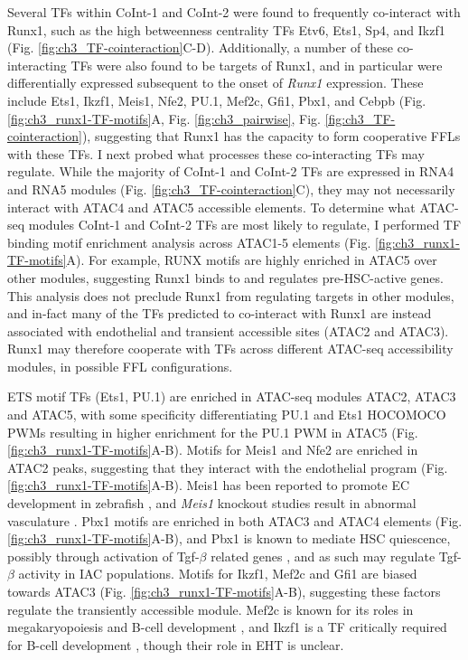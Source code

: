 Several TFs within CoInt-1 and CoInt-2 were found to frequently co-interact with Runx1, such as the high betweenness centrality TFs Etv6, Ets1, Sp4, and Ikzf1 (Fig. \ref{fig:ch3_TF-cointeraction}C-D). Additionally, a number of these co-interacting TFs were also found to be targets of Runx1, and in particular were differentially expressed subsequent to the onset of \textit{Runx1} expression. These include Ets1, Ikzf1, Meis1, Nfe2, PU.1, Mef2c, Gfi1, Pbx1, and Cebpb (Fig. \ref{fig:ch3_runx1-TF-motifs}A, Fig. \ref{fig:ch3_pairwise}, Fig. \ref{fig:ch3_TF-cointeraction}), suggesting that Runx1 has the capacity to form cooperative FFLs with these TFs. I next probed what processes these co-interacting TFs may regulate. While the majority of CoInt-1 and CoInt-2 TFs are expressed in RNA4 and RNA5 modules (Fig. \ref{fig:ch3_TF-cointeraction}C), they may not necessarily interact with ATAC4 and ATAC5 accessible elements. To determine what ATAC-seq modules CoInt-1 and CoInt-2 TFs are most likely to regulate, I performed TF binding motif enrichment analysis across ATAC1-5 elements (Fig. \ref{fig:ch3_runx1-TF-motifs}A). For example, RUNX motifs are highly enriched in ATAC5 over other modules, suggesting Runx1 binds to and regulates pre-HSC-active genes. This analysis does not preclude Runx1 from regulating targets in other modules, and in-fact many of the TFs predicted to co-interact with Runx1 are instead associated with endothelial and transient accessible sites (ATAC2 and ATAC3). Runx1 may therefore cooperate with TFs across different ATAC-seq accessibility modules, in possible FFL configurations. 

ETS motif TFs (Ets1, PU.1) are enriched in ATAC-seq modules ATAC2, ATAC3 and ATAC5, with some specificity differentiating PU.1 and Ets1 HOCOMOCO PWMs resulting in higher enrichment for the PU.1 PWM in ATAC5 (Fig. \ref{fig:ch3_runx1-TF-motifs}A-B). Motifs for Meis1 and Nfe2 are enriched in ATAC2 peaks, suggesting that they interact with the endothelial program (Fig. \ref{fig:ch3_runx1-TF-motifs}A-B). Meis1 has been reported to promote EC development in zebrafish \citep{minehata_meis1_2008}, and \textit{Meis1} knockout studies result in abnormal vasculature \citep{hisa_hematopoietic_2004}. Pbx1 motifs are enriched in both ATAC3 and ATAC4 elements (Fig. \ref{fig:ch3_runx1-TF-motifs}A-B), and Pbx1 is known to mediate HSC quiescence, possibly through activation of Tgf-$\beta$ related genes \citep{ficara_pbx1_2008}, and as such may regulate Tgf-$\beta$ activity in IAC populations. Motifs for Ikzf1, Mef2c and Gfi1 are biased towards ATAC3 (Fig. \ref{fig:ch3_runx1-TF-motifs}A-B), suggesting these factors regulate the transiently accessible module. Mef2c is known for its roles in megakaryopoiesis and B-cell development \citep{gekas_mef2c_2009}, and Ikzf1 is a TF critically required for B-cell development \citep{nichogiannopoulou_defects_1999}, though their role in EHT is unclear.

